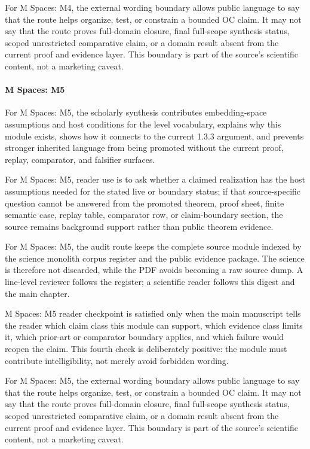 For M Spaces: M4, the external wording boundary allows public language to say that the route helps organize, test, or constrain a bounded OC claim. It may not say that the route proves full-domain closure, final full-scope synthesis status, scoped unrestricted comparative claim, or a domain result absent from the current proof and evidence layer. This boundary is part of the source's scientific content, not a marketing caveat.


\paragraph{M Spaces: M5}

For M Spaces: M5, the scholarly synthesis contributes embedding-space assumptions and host conditions for the level vocabulary, explains why this module exists, shows how it connects to the current 1.3.3 argument, and prevents stronger inherited language from being promoted without the current proof, replay, comparator, and falsifier surfaces.


For M Spaces: M5, reader use is to ask whether a claimed realization has the host assumptions needed for the stated live or boundary status; if that source-specific question cannot be answered from the promoted theorem, proof sheet, finite semantic case, replay table, comparator row, or claim-boundary section, the source remains background support rather than public theorem evidence.


For M Spaces: M5, the audit route keeps the complete source module indexed by the science monolith corpus register and the public evidence package. The science is therefore not discarded, while the PDF avoids becoming a raw source dump. A line-level reviewer follows the register; a scientific reader follows this digest and the main chapter.


M Spaces: M5 reader checkpoint is satisfied only when the main manuscript tells the reader which claim class this module can support, which evidence class limits it, which prior-art or comparator boundary applies, and which failure would reopen the claim. This fourth check is deliberately positive: the module must contribute intelligibility, not merely avoid forbidden wording.


For M Spaces: M5, the external wording boundary allows public language to say that the route helps organize, test, or constrain a bounded OC claim. It may not say that the route proves full-domain closure, final full-scope synthesis status, scoped unrestricted comparative claim, or a domain result absent from the current proof and evidence layer. This boundary is part of the source's scientific content, not a marketing caveat.


